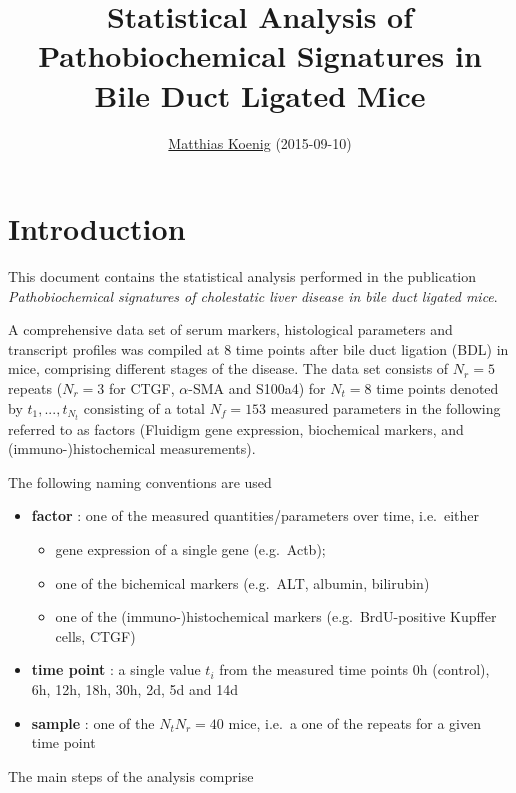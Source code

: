 \documentclass[]{article}
\title{Statistical Analysis of Pathobiochemical Signatures in Bile Duct Ligated
Mice}
\author{\href{http://www.charite.de/sysbio/people/koenig}{Matthias Koenig}
(2015-09-10)}
\date{}
\begin{document}
\maketitle


{
\hypersetup{linkcolor=black}
\setcounter{tocdepth}{2}
\tableofcontents
}
\section{Introduction}\label{introduction}

This document contains the statistical analysis performed in the
publication \emph{Pathobiochemical signatures of cholestatic liver
disease in bile duct ligated mice}.

A comprehensive data set of serum markers, histological parameters and
transcript profiles was compiled at 8 time points after bile duct
ligation (BDL) in mice, comprising different stages of the disease. The
data set consists of \(N_{r}=5\) repeats (\(N_{r}=3\) for CTGF,
\(\alpha\)-SMA and S100a4) for \(N_{t}=8\) time points denoted by
\(t_1,..., t_{N_t}\) consisting of a total \(N_{f}=153\) measured
parameters in the following referred to as factors (Fluidigm gene
expression, biochemical markers, and (immuno-)histochemical
measurements).

The following naming conventions are used

\begin{itemize}
\itemsep1pt\parskip0pt
\item
  \textbf{factor} : one of the measured quantities/parameters over time,
  i.e.~either

  \begin{itemize}
  \itemsep1pt\parskip0pt
  \item
    gene expression of a single gene (e.g.~Actb);
  \item
    one of the bichemical markers (e.g.~ALT, albumin, bilirubin)
  \item
    one of the (immuno-)histochemical markers (e.g.~BrdU-positive
    Kupffer cells, CTGF)
  \end{itemize}
\item
  \textbf{time point} : a single value \(t_i\) from the measured time
  points 0h (control), 6h, 12h, 18h, 30h, 2d, 5d and 14d
\item
  \textbf{sample} : one of the \(N_{t}N_{r}=40\) mice, i.e.~a one of the
  repeats for a given time point
\end{itemize}

The main steps of the analysis comprise
\end{document}
